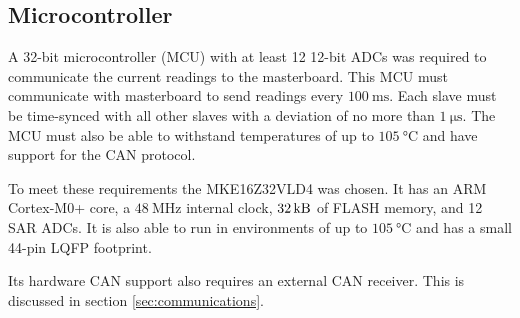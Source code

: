 \subsection{Microcontroller}
\label{sec:microcontroller}

A 32-bit microcontroller (MCU) with at least 12 12-bit ADCs was required to communicate the current readings to the masterboard.
This MCU must communicate with masterboard to send readings every $\SI{100}{\milli\second}$.
Each slave must be time-synced with all other slaves with a deviation of no more than $\SI{1}{\micro\second}$.
The MCU must also be able to withstand temperatures of up to $\SI{105}{\degreeCelsius}$ and have support for the CAN protocol.

To meet these requirements the MKE16Z32VLD4 was chosen.
It has an ARM Cortex-M0+ core, a $\SI{48}{\mega\hertz}$ internal clock, $\SI{32}{\kilo\byte}$ of FLASH memory, and 12 SAR ADCs.
It is also able to run in environments of up to $\SI{105}{\degreeCelsius}$ and has a small 44-pin LQFP footprint.

Its hardware CAN support also requires an external CAN receiver.
This is discussed in section \ref{sec:communications}.


